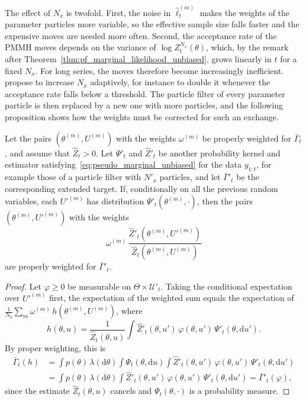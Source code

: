 The effect of $N_x$ is twofold. First, the noise in $\hat{\ell}_t^{(m)}$ makes the weights of the parameter particles more variable, so the effective sample size falls faster and the expensive moves are needed more often. Second, the acceptance rate of the PMMH moves depends on the variance of $\log Z_t^{N_x}(\theta)$, which, by the remark after Theorem~\ref{thm:pf_marginal_likelihood_unbiased}, grows linearly in $t$ for a fixed $N_x$. For long series, the moves therefore become increasingly inefficient. \cite{chopin2013smc2} propose to increase $N_x$ adaptively, for instance to double it whenever the acceptance rate falls below a threshold. The particle filter of every parameter particle is then replaced by a new one with more particles, and the following proposition shows how the weights must be corrected for such an exchange.

\begin{proposition}
    \label{prop:smc2_exchange}
    Let the pairs $(\theta^{(m)},U^{(m)})$ with the weights $\omega^{(m)}$ be properly weighted for $\bar{\Gamma}_t$, and assume that $\hat{Z}_t>0$. Let $\Psi'_t$ and $\hat{Z}'_t$ be another probability kernel and estimator satisfying~\eqref{eq:pseudo_marginal_unbiased} for the data $y_{1:t}$, for example those of a particle filter with $N'_x$ particles, and let $\bar{\Gamma}'_t$ be the corresponding extended target. If, conditionally on all the previous random variables, each $U'^{(m)}$ has distribution $\Psi'_t(\theta^{(m)},\cdot)$, then the pairs $(\theta^{(m)},U'^{(m)})$ with the weights
    \begin{equation}
        \omega^{(m)}\,\frac{\hat{Z}'_t(\theta^{(m)},U'^{(m)})}{\hat{Z}_t(\theta^{(m)},U^{(m)})}
    \end{equation}
    are properly weighted for $\bar{\Gamma}'_t$.
\end{proposition}
\begin{proof}
    Let $\varphi\ge0$ be measurable on $\Theta\times\mathcal{U}'_t$. Taking the conditional expectation over $U'^{(m)}$ first, the expectation of the weighted sum equals the expectation of $\frac{1}{N_\theta}\sum_m\omega^{(m)}\,h(\theta^{(m)},U^{(m)})$, where
    \begin{equation}
        h(\theta,u) = \frac{1}{\hat{Z}_t(\theta,u)}\int\hat{Z}'_t(\theta,u')\,\varphi(\theta,u')\,\Psi'_t(\theta,\mathrm{d}u').
    \end{equation}
    By proper weighting, this is
    \begin{align}
        \bar{\Gamma}_t(h) &= \int p(\theta)\,\lambda(\mathrm{d}\theta)\int\Psi_t(\theta,\mathrm{d}u)\int\hat{Z}'_t(\theta,u')\,\varphi(\theta,u')\,\Psi'_t(\theta,\mathrm{d}u') \\
        &= \int p(\theta)\,\lambda(\mathrm{d}\theta)\int\hat{Z}'_t(\theta,u')\,\varphi(\theta,u')\,\Psi'_t(\theta,\mathrm{d}u') = \bar{\Gamma}'_t(\varphi),
    \end{align}
    since the estimate $\hat{Z}_t(\theta,u)$ cancels and $\Psi_t(\theta,\cdot)$ is a probability measure.
\end{proof}

